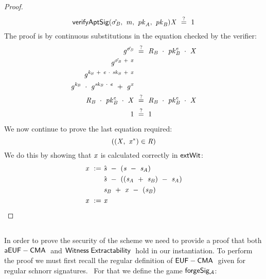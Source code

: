 \begin{proof}
    \[
        \mathsf{verifyAptSig}(\hat{\sigma_{\mathit{B}}} ,~ \mathit{m} ,~ \mathit{pk}_{\mathit{A}} ,~ \mathit{pk}_{\mathit{B}}){\mathit{X}} ~\stackrel{?}{=}~ 1
    \]
    The proof is by continuous substitutions in the equation checked by the verifier:
    \begin{align}
        \mathit{g}^{\hat{\sigma_{\mathit{B}}}} &~\stackrel{?}{=}~ \mathit{R}_{\mathit{B}} ~\cdot~ \mathit{pk}_{\mathit{B}}^{\mathit{e}} ~\cdot~ \mathit{X} \\
        \mathit{g}^{\tilde{\sigma_{\mathit{B}}} ~+~ \mathit{x}} & \\
        \mathit{g}^{\mathit{\mathit{k}_{\mathit{B}}} ~+~ \mathit{e} ~\cdot~ \mathit{sk}_{\mathit{B}} ~+~ \mathit{x}} & \\
        \mathit{g}^{\mathit{\mathit{k}_{\mathit{B}}}} ~\cdot~ \mathit{g}^{\mathit{sk}_{\mathit{B}} ~\cdot~ \mathit{e}} ~+~ \mathit{g}^{\mathit{x}} & \\
        \mathit{R}_{\mathit{B}} ~\cdot~ \mathit{pk}_{\mathit{B}}^{\mathit{e}} ~\cdot~ \mathit{X} &~\stackrel{?}{=}~ \mathit{R}_{\mathit{B}} ~\cdot~ \mathit{pk}_{\mathit{B}}^{\mathit{e}} ~\cdot~ \mathit{X} \\
        1 &~\stackrel{?}{=}~ 1
    \end{align}
    We now continue to prove the last equation required:
    \[
        ((\mathit{X} ,~ \mathit{x}^*) \in \mathit{R})
    \]
    We do this by showing that $\mathit{x}$ is calculated correctly in $\mathsf{extWit}$:
    \begin{align}
        \mathit{x} ~:=~ & \hat{\mathit{s}} ~-~ (\mathit{s} ~-~ \mathit{s}_{\mathit{A}}) \\
        & \hat{\mathit{s}} ~-~ ((\mathit{s}_{\mathit{A}} ~+~ \mathit{s}_{\mathit{B}} ) ~-~ \mathit{s}_{\mathit{A}} ) \\
        & \mathit{s}_{\mathit{B}} ~+~ \mathit{x} ~-~ (\mathit{s}_{\mathit{B}}) \\
        \mathit{x} ~:=~ & \mathit{x} \\
    \end{align}
\end{proof}

\subsection{\cnstSecureAptScheme}\label{subsec:cnstsecureaptscheme}

In order to prove the security of the scheme we need to provide a proof that both $\mathsf{aEUF-CMA\;}$ and $\mathsf{Witness\;Extractability\;}$ hold in our instantiation.
To perform the proof we must first recall the regular definition of $\mathsf{EUF-CMA\;}$ given for regular schnorr signatures.~\cite{schnorr1989efficient} For that we define the game $\mathsf{forgeSig_{\mathcal{A}}}$:

